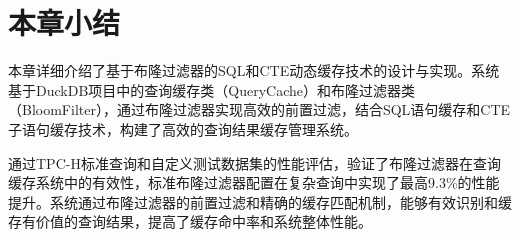 \section{本章小结}

本章详细介绍了基于布隆过滤器的SQL和CTE动态缓存技术的设计与实现。系统基于DuckDB项目中的查询缓存类（QueryCache）和布隆过滤器类（BloomFilter），通过布隆过滤器实现高效的前置过滤，结合SQL语句缓存和CTE子语句缓存技术，构建了高效的查询结果缓存管理系统。

通过TPC-H标准查询和自定义测试数据集的性能评估，验证了布隆过滤器在查询缓存系统中的有效性，标准布隆过滤器配置在复杂查询中实现了最高9.3\%的性能提升。系统通过布隆过滤器的前置过滤和精确的缓存匹配机制，能够有效识别和缓存有价值的查询结果，提高了缓存命中率和系统整体性能。